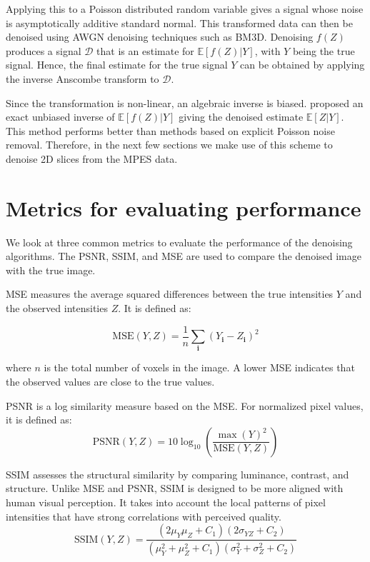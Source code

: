 Applying this to a Poisson distributed random variable gives a signal whose noise is asymptotically additive standard normal. This transformed data can then be denoised using \gls{AWGN} denoising techniques such as \gls{BM3D}. Denoising $f(Z)$ produces a signal $\mathcal{D}$ that is an estimate for $\mathbb{E}[f(Z) | Y]$, with $Y$ being the true signal. Hence, the final estimate for the true signal $Y$ can be obtained by applying the inverse Anscombe transform to $\mathcal{D}$.

Since the transformation is non-linear, an algebraic inverse is biased. \citeauthor{makitaloOptimalInversionAnscombe2011} \cite{makitaloOptimalInversionAnscombe2011} proposed an exact unbiased inverse of $\mathbb{E}[f(Z) | Y]$ giving the denoised estimate $\mathbb{E}[Z | Y]$. This method performs better than methods based on explicit Poisson noise removal. Therefore, in the next few sections we make use of this scheme to denoise 2D slices from the \gls{MPES} data.

\section{Metrics for evaluating performance}
We look at three common metrics to evaluate the performance of the denoising algorithms. The \gls{PSNR}, \gls{SSIM}, and \gls{MSE} are used to compare the denoised image with the true image.

\gls{MSE} measures the average squared differences between the true intensities  $Y$  and the observed intensities  $Z$. It is defined as:

\begin{equation}
    \text{MSE}(Y, Z) = \frac{1}{n} \sum_{\mathbf{i}} (Y_{\mathbf{i}} - Z_{\mathbf{i}})^2
\end{equation}

where $n$ is the total number of voxels in the image. A lower \gls{MSE} indicates that the observed values are close to the true values.

\gls{PSNR} is a log similarity measure based on the \gls{MSE}. For normalized pixel values, it is defined as:
\begin{equation}
    \text{PSNR}(Y, Z) = 10 \log_{10} \left( \frac{\max(Y)^2}{\text{MSE}(Y, Z)} \right)
\end{equation}

\gls{SSIM} assesses the structural similarity by comparing luminance, contrast, and structure. Unlike MSE and PSNR, SSIM is designed to be more aligned with human visual perception. It takes into account the local patterns of pixel intensities that have strong correlations with perceived quality.
\begin{equation}
    \text{SSIM}(Y, Z) = \frac{(2\mu_Y \mu_Z + C_1)(2\sigma_{YZ} + C_2)}{(\mu_Y^2 + \mu_Z^2 + C_1)(\sigma_Y^2 + \sigma_Z^2 + C_2)}
\end{equation}

